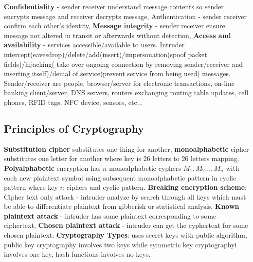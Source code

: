 \documentclass[9pt]{extarticle}
\begin{document}
\begin{multicols}{2}
\textbf{Confidentiality} - sender receiver understand message contents so sender encrypts message and receiver decrypts message, Authentication - sender receiver confirm each other's identity,\textbf{ Message integrity} - sender receiver ensure message not altered in transit or afterwards without detection, \textbf{Access and availability} - services accessible/available to users. Intruder intercept(eavesdrop)/delete/add(insert)/impersonation(spoof packet fields)/hijacking( take over ongoing connection by removing sender/receiver and inserting itself)/denial of service(prevent service from being used) messages. Sender/receiver are people, browser/server for electronic transactions, on-line banking client/server, DNS servers, routers exchanging routing table updates, cell phones, RFID tags, NFC device, sensors, etc...

\subsection{Principles of Cryptography}

\textbf{Substitution cipher} substitutes one thing for another, \textbf{monoalphabetic} cipher substitutes one letter for another where key is 26 letters to 26 letters mapping. \textbf{Polyalphabetic} encryption has $n$ monoalphabetic cyphers $M_1,M_2\dots,M_n$ with each new plaintext symbol using subsequent monoalphabetic pattern in cyclic pattern where key $n$ ciphers and cyclic pattern. \textbf{Breaking encryption scheme}: Cipher text only attack - intruder analyze by search through all keys which must be able to differentiate plaintext from gibberish or statistical analysis, \textbf{Known plaintext attack} - intruder has some plaintext corresponding to some ciphertext, \textbf{Chosen plaintext attack} - intruder can get the cyphertext for some chosen plaintext. \textbf{Cryptography Types}: uses secret keys with public algorithm, public key cryptography involves two keys while symmetric key cryptographyi involves one key, hash functions involves no keys.


\end{multicols}
\end{document}
